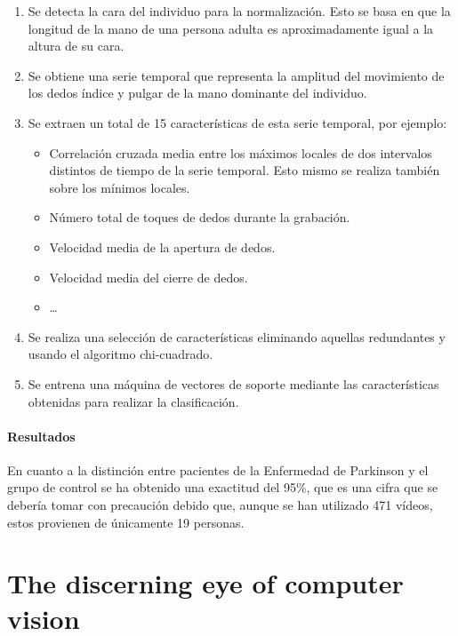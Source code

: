 \begin{enumerate}
    \item Se detecta la cara del individuo para la normalización. Esto se basa
          en que la longitud de la mano de una persona adulta es aproximadamente
          igual a la altura de su cara.
    \item Se obtiene una serie temporal que representa la amplitud del
          movimiento de los dedos índice y pulgar de la mano dominante del
          individuo.
    \item Se extraen un total de 15 características de esta serie temporal, por
          ejemplo:
          \begin{itemize}
              \item Correlación cruzada media entre los máximos locales de dos
                    intervalos distintos de tiempo de la serie temporal. Esto
                    mismo se realiza también sobre los mínimos locales.
              \item Número total de toques de dedos durante la grabación.
              \item Velocidad media de la apertura de dedos.
              \item Velocidad media del cierre de dedos.
              \item \dots
          \end{itemize}
    \item Se realiza una selección de características eliminando aquellas
          redundantes y usando el algoritmo chi-cuadrado.
    \item Se entrena una máquina de vectores de soporte mediante las
          características obtenidas para realizar la clasificación.
\end{enumerate}


\paragraph{Resultados}

En cuanto a la distinción entre pacientes de la Enfermedad de Parkinson y el
grupo de control se ha obtenido una exactitud del 95\%, que es una cifra que se
debería tomar con precaución debido que, aunque se han utilizado 471 vídeos,
estos provienen de únicamente 19 personas.


\section{The discerning eye of computer vision}

